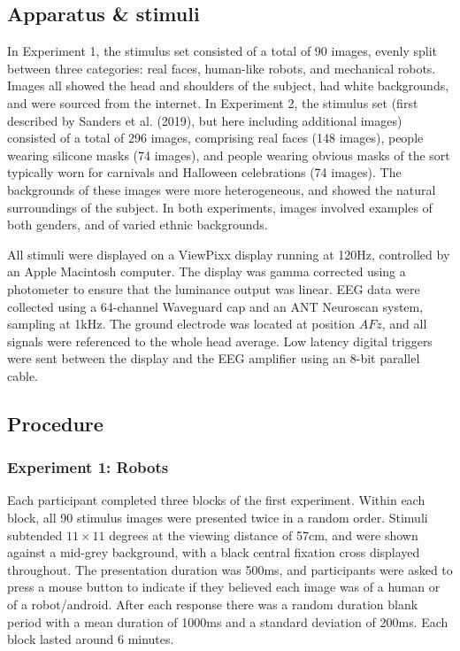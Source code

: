 \documentclass[
]{article}
\begin{document}
\subsection{Apparatus \& stimuli}\label{apparatus-stimuli}

In Experiment 1, the stimulus set consisted of a total of 90 images, evenly split between three categories: real faces, human-like robots, and mechanical robots. Images all showed the head and shoulders of the subject, had white backgrounds, and were sourced from the internet. In Experiment 2, the stimulus set (first described by Sanders et al. (2019), but here including additional images) consisted of a total of 296 images, comprising real faces (148 images), people wearing silicone masks (74 images), and people wearing obvious masks of the sort typically worn for carnivals and Halloween celebrations (74 images). The backgrounds of these images were more heterogeneous, and showed the natural surroundings of the subject. In both experiments, images involved examples of both genders, and of varied ethnic backgrounds.

All stimuli were displayed on a ViewPixx display running at 120Hz, controlled by an Apple Macintosh computer. The display was gamma corrected using a photometer to ensure that the luminance output was linear. EEG data were collected using a 64-channel Waveguard cap and an ANT Neuroscan system, sampling at 1kHz. The ground electrode was located at position \(AFz\), and all signals were referenced to the whole head average. Low latency digital triggers were sent between the display and the EEG amplifier using an 8-bit parallel cable.

\subsection{Procedure}\label{procedure}

\subsubsection{Experiment 1: Robots}\label{experiment-1-robots}

Each participant completed three blocks of the first experiment. Within each block, all 90 stimulus images were presented twice in a random order. Stimuli subtended \(11\times11\) degrees at the viewing distance of 57cm, and were shown against a mid-grey background, with a black central fixation cross displayed throughout. The presentation duration was 500ms, and participants were asked to press a mouse button to indicate if they believed each image was of a human or of a robot/android. After each response there was a random duration blank period with a mean duration of 1000ms and a standard deviation of 200ms. Each block lasted around 6 minutes.
\end{document}
